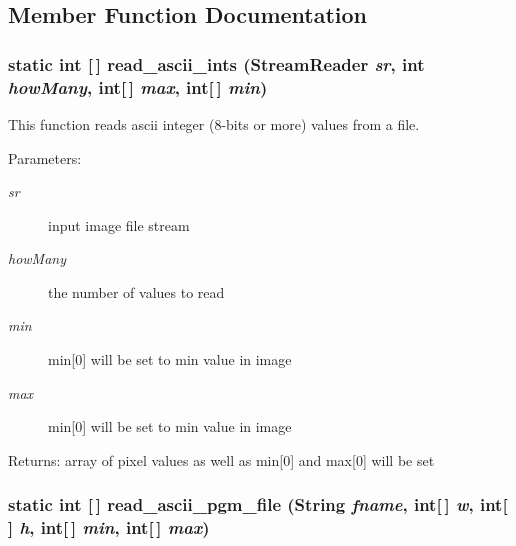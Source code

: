 \subsection{Member Function Documentation}
\subsubsection{\setlength{\rightskip}{0pt plus 5cm}static int [$\,$] read\_\-ascii\_\-ints (Stream\-Reader {\em sr}, int {\em how\-Many}, int[$\,$] {\em max}, int[$\,$] {\em min})\hspace{0.3cm}{\tt  [static, protected]}}\label{class_c_s_image_viewer_1_1pnm_helper_6fe0359657ec33392595cf78659fbc9f}


This function reads ascii integer (8-bits or more) values from a file. 

\begin{Desc}
\item[Parameters:]
\begin{description}
\item[{\em sr}]input image file stream \item[{\em how\-Many}]the number of values to read \item[{\em min}]min[0] will be set to min value in image \item[{\em max}]min[0] will be set to min value in image\end{description}
\end{Desc}
\begin{Desc}
\item[Returns:]array of pixel values as well as min[0] and max[0] will be set \end{Desc}
\subsubsection{\setlength{\rightskip}{0pt plus 5cm}static int [$\,$] read\_\-ascii\_\-pgm\_\-file (String {\em fname}, int[$\,$] {\em w}, int[$\,$] {\em h}, int[$\,$] {\em min}, int[$\,$] {\em max})\hspace{0.3cm}{\tt  [static, protected]}}\label{class_c_s_image_viewer_1_1pnm_helper_3bd4246b9d877004064ab5792ed6d16d}


